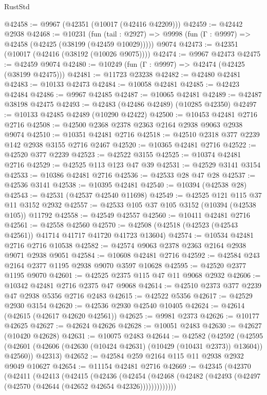 \begin{lexlean}{RustStd}
\begin{coremodule}
@42458 := @9967 (@42351 (@10017 (@42416 @42209)))
@42459 := @42442 @2938
@42468 := @10231
    (fun (tail : @2927) => @9998 (fun (Γ : @9997) => @42458 (@42425 (@38199 (@42459 @10029)))))
    @9074
@42473 := @42351 (@10017 (@42416 (@38192 (@10026 @9075))))
@42474 := @9967 @42473
@42475 := @42459 @9074
@42480 := @10249 (fun (Γ : @9997) => @42474 (@42425 (@38199 @42475)))
@42481 := @11723 @23238
@42482 := @42480 @42481
@42483 := @10133 @42473
@42484 := @10058 @42481
@42485 := @42423 @42484
@42486 := @9967 @42485
@42487 := @10065 @42481
@42489 := @42487 @38198 @42475
@42493 := @42483 (@42486 @42489) (@10285 @42350)
@42497 := @10133 @42485 @42489 (@10290 @42422)
@42500 := @10453 @42481 @2716 @2716
@42508 := @42500 @2368 @2378 @2363 @2164 @2938 @9063 @2938 @9074
@42510 := @10351 @42481 @2716
@42518 := @42510 @2318 @377 @2239 @142 @2938 @3155 @2716 @2467
@42520 := @10365 @42481 @2716
@42522 := @42520 @377 @2239
@42523 := @42522 @3155
@42525 := @10374 @42481 @2716
@42529 := @42525 @113 @123 @47 @39
@42531 := @42529 @3141 @3154
@42533 := @10386 @42481 @2716
@42536 := @42533 @28 @47 @28
@42537 := @42536 @3141
@42538 := @10395 @42481
@42540 := @10394 (@42538 @28)
@42543 := @42531 (@42537 @42540 @11698)
@42549 := @42525 @121 @115 @37 @11 @3152 @2932
@42557 := @42533 @105 @37 @105 @3152 (@10394 (@42538 @105)) @11792
@42558 := @42549 @42557
@42560 := @10411 @42481 @2716
@42561 := @42558 @42560
@42570 := @42508 (@42518 (@42523 (@42543 @42561)) @41714 @41717 @41720 @41723 @13604)
@42574 := @10534 @42481 @2716 @2716 @10538
@42582 := @42574 @9063 @2378 @2363 @2164 @2938 @9071 @2938 @9051
@42584 := @10608 @42481 @2716
@42592 := @42584 @243 @2164 @2377 @1195 @2938 @9070 @3597 @10628
@42595 := @42520 @2377 @1195 @9070
@42601 := @42525 @2375 @115 @47 @11 @9068 @2932
@42606 := @10342 @42481 @2716 @2375 @47 @9068
@42614 := @42510 @2373 @377 @2239 @47 @2938 @5356 @2716 @2483
@42615 := @42522 @5356
@42617 := @42529 @2930 @3154
@42620 := @42536 @2930 @42540 @10405
@42624 := @42614 (@42615 (@42617 @42620 @42561))
@42625 := @9981 @2373
@42626 := @10177 @42625
@42627 := @42624 @42626
@42628 := @10051 @2483
@42630 := @42627 (@10420 @42628)
@42631 := @10075 @2483
@42644 := @42582
    (@42592
      (@42595 (@42601 (@42606 (@42630 (@10424 @42631) (@10429 (@10431 @2373)) @13604)) @42560))
      @42313)
@42652 := @42584 @259 @2164 @115 @11 @2938 @2932 @9049 @10627
@42654 := @11154 @42481 @2716
@42669 := @42345
    (@42370
      (@42411
        (@42413
          (@42415
            (@42436
              (@42454
                (@42468 (@42482 (@42493 (@42497 (@42570 (@42644 (@42652 @42654 @42326)))))))))))))

\end{coremodule}
\end{lexlean}
